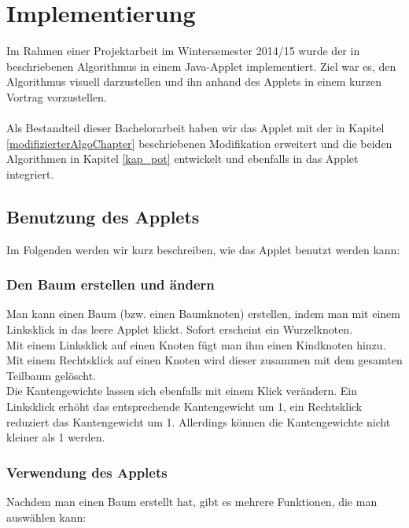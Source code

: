\section{Implementierung}\label{kap_implementierung}

Im Rahmen einer Projektarbeit im Wintersemester 2014/15 wurde der in \cite{cima_paper} beschriebenen Algorithmus in einem Java-Applet implementiert. Ziel war es, den Algorithmus visuell darzustellen und ihn anhand des Applets in einem kurzen Vortrag vorzustellen.
\\
\\
Als Bestandteil dieser Bachelorarbeit haben wir das Applet mit der in Kapitel \ref{modifizierterAlgoChapter} beschriebenen Modifikation erweitert und die beiden Algorithmen in Kapitel \ref{kap_pot} entwickelt und ebenfalls in das Applet integriert.


\subsection{Benutzung des Applets}

Im Folgenden werden wir kurz beschreiben, wie das Applet benutzt werden kann:

\subsubsection*{Den Baum erstellen und ändern}

Man kann einen Baum (bzw. einen Baumknoten) erstellen, indem man mit einem Linksklick in das leere Applet klickt. Sofort erscheint ein Wurzelknoten.\\
Mit einem Linksklick auf einen Knoten fügt man ihm einen Kindknoten hinzu. Mit einem Rechtsklick auf einen Knoten wird dieser zusammen mit dem gesamten Teilbaum gelöscht.\\
Die Kantengewichte lassen sich ebenfalls mit einem Klick verändern. Ein Linksklick erhöht das entsprechende Kantengewicht um 1, ein Rechtsklick reduziert das Kantengewicht um 1. Allerdings können die Kantengewichte nicht kleiner als 1 werden.


\subsubsection*{Verwendung des Applets}

Nachdem man einen Baum erstellt hat, gibt es mehrere Funktionen, die man auswählen kann:\\

